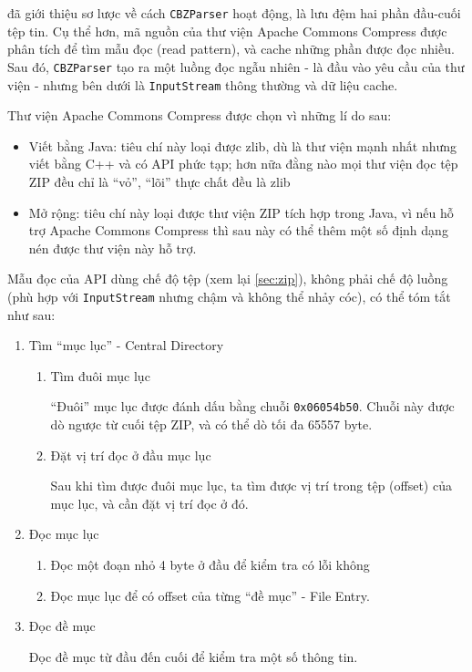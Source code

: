 \documentclass[../../thesis]{subfiles}
\begin{document}
 đã giới thiệu sơ lược về cách \texttt{CBZParser} hoạt
động, là lưu đệm hai phần đầu-cuối tệp tin. Cụ thể hơn, mã nguồn của thư viện
Apache Commons Compress được phân tích để tìm mẫu đọc (read pattern), và cache
những phần được đọc nhiều. Sau đó, \texttt{CBZParser} tạo ra một luồng đọc ngẫu
nhiên - là đầu vào yêu cầu của thư viện - nhưng bên dưới là \texttt{InputStream}
thông thường và dữ liệu cache.

Thư viện Apache Commons Compress được chọn vì những lí do sau:

\begin{itemize}
    \item
        Viết bằng Java: tiêu chí này loại được zlib, dù là thư viện mạnh nhất
        nhưng viết bằng C++ và có API phức tạp; hơn nữa đằng nào mọi thư viện
        đọc tệp ZIP đều chỉ là ``vỏ'', ``lõi'' thực chất đều là zlib
    \item
        Mở rộng: tiêu chí này loại được thư viện ZIP tích hợp trong Java, vì nếu
        hỗ trợ Apache Commons Compress thì sau này có thể thêm một số định dạng
        nén được thư viện này hỗ trợ.
\end{itemize}

Mẫu đọc của API dùng chế độ tệp (xem lại \autoref{sec:zip}), không phải chế độ
luồng (phù hợp với \texttt{InputStream} nhưng chậm và không thể nhảy cóc), có
thể tóm tắt như sau:

\begin{enumerate}
    \item
        Tìm ``mục lục'' - Central Directory

        \begin{enumerate}
            \item
                Tìm đuôi mục lục

                ``Đuôi'' mục lục được đánh dấu bằng chuỗi \texttt{0x06054b50}.
                Chuỗi này được dò ngược từ cuối tệp ZIP, và có thể dò tối đa
                65557 byte.
            \item
                Đặt vị trí đọc ở đầu mục lục

                Sau khi tìm được đuôi mục lục, ta tìm được vị trí trong tệp
                (offset) của mục lục, và cần đặt vị trí đọc ở đó.
        \end{enumerate}
    \item
        Đọc mục lục

        \begin{enumerate}
            \item
                Đọc một đoạn nhỏ 4 byte ở đầu để kiểm tra có lỗi không
            \item
                Đọc mục lục để có offset của từng ``đề mục'' - File Entry.
        \end{enumerate}
    \item
        Đọc đề mục

        Đọc đề mục từ đầu đến cuối để kiểm tra một số thông tin.
\end{enumerate}
\end{document}
